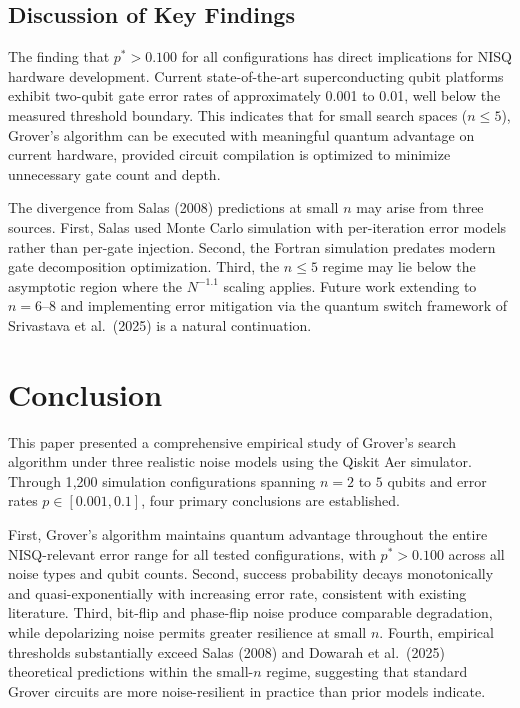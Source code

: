 \documentclass[conference]{IEEEtran}
\begin{document}
\subsection{Discussion of Key Findings}

The finding that $p^{*} > 0.100$ for all configurations has direct implications for
NISQ hardware development. Current state-of-the-art superconducting qubit platforms
exhibit two-qubit gate error rates of approximately 0.001 to 0.01, well below the
measured threshold boundary. This indicates that for small search spaces ($n \leq 5$),
Grover's algorithm can be executed with meaningful quantum advantage on current
hardware, provided circuit compilation is optimized to minimize unnecessary gate
count and depth.

The divergence from Salas (2008) predictions at small $n$ may arise from three
sources. First, Salas used Monte Carlo simulation with per-iteration error models
rather than per-gate injection. Second, the Fortran simulation predates modern gate
decomposition optimization. Third, the $n \leq 5$ regime may lie below the
asymptotic region where the $N^{-1.1}$ scaling applies. Future work extending to
$n = 6$--$8$ and implementing error mitigation via the quantum switch framework of
Srivastava et al.\ (2025) is a natural continuation.

\section{Conclusion}

This paper presented a comprehensive empirical study of Grover's search algorithm
under three realistic noise models using the Qiskit Aer simulator. Through 1{,}200
simulation configurations spanning $n = 2$ to $5$ qubits and error rates
$p \in [0.001, 0.1]$, four primary conclusions are established.

First, Grover's algorithm maintains quantum advantage throughout the entire
NISQ-relevant error range for all tested configurations, with $p^{*} > 0.100$
across all noise types and qubit counts. Second, success probability decays
monotonically and quasi-exponentially with increasing error rate, consistent with
existing literature. Third, bit-flip and phase-flip noise produce comparable
degradation, while depolarizing noise permits greater resilience at small $n$.
Fourth, empirical thresholds substantially exceed Salas (2008) and Dowarah et al.\
(2025) theoretical predictions within the small-$n$ regime, suggesting that standard
Grover circuits are more noise-resilient in practice than prior models indicate.
\end{document}
